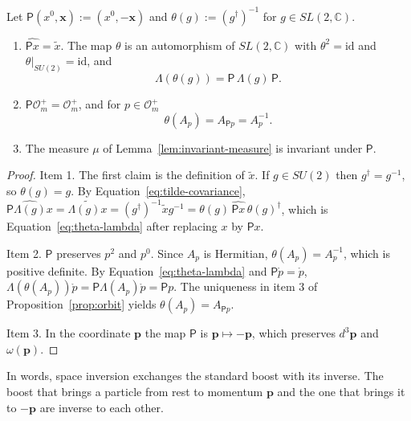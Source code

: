 	\begin{lemma}\label{lem:inversion}
		Let $\mathsf{P}(x^0,\mathbf{x}):=(x^0,-\mathbf{x})$ and $\theta(g):=(g^\dagger)^{-1}$ for $g\in SL(2,\mathbb{C})$.
		\begin{enumerate}
			\item $\widehat{\mathsf{P}x}=\tilde{x}$. The map $\theta$ is an automorphism of $SL(2,\mathbb{C})$ with $\theta^2=\mathrm{id}$ and $\theta|_{SU(2)}=\mathrm{id}$, and
			\begin{equation}\label{eq:theta-lambda}
				\Lambda(\theta(g))=\mathsf{P}\,\Lambda(g)\,\mathsf{P}.
			\end{equation}
			\item $\mathsf{P}\mathcal{O}_m^+=\mathcal{O}_m^+$, and for $p\in\mathcal{O}_m^+$
			\begin{equation}\label{eq:theta-boost}
				\theta(A_p)=A_{\mathsf{P}p}=A_p^{-1}.
			\end{equation}
			\item The measure $\mu$ of Lemma~\ref{lem:invariant-measure} is invariant under $\mathsf{P}$.
		\end{enumerate}
	\end{lemma}
	
	\begin{proof}
		Item 1. The first claim is the definition of $\tilde{x}$. If $g\in SU(2)$ then $g^\dagger=g^{-1}$, so $\theta(g)=g$. By Equation~\eqref{eq:tilde-covariance}, $\widehat{\mathsf{P}\Lambda(g)x}=\widetilde{\Lambda(g)x}=(g^\dagger)^{-1}\tilde{x}g^{-1}=\theta(g)\,\widehat{\mathsf{P}x}\,\theta(g)^\dagger$, which is Equation~\eqref{eq:theta-lambda} after replacing $x$ by $\mathsf{P}x$.
		
		Item 2. $\mathsf{P}$ preserves $p^2$ and $p^0$. Since $A_p$ is Hermitian, $\theta(A_p)=A_p^{-1}$, which is positive definite. By Equation~\eqref{eq:theta-lambda} and $\mathsf{P}\mathring{p}=\mathring{p}$, $\Lambda(\theta(A_p))\mathring{p}=\mathsf{P}\Lambda(A_p)\mathring{p}=\mathsf{P}p$. The uniqueness in item 3 of Proposition~\ref{prop:orbit} yields $\theta(A_p)=A_{\mathsf{P}p}$.
		
		Item 3. In the coordinate $\mathbf{p}$ the map $\mathsf{P}$ is $\mathbf{p}\mapsto-\mathbf{p}$, which preserves $d^3\mathbf{p}$ and $\omega(\mathbf{p})$.
	\end{proof}
	
	\noindent In words, space inversion exchanges the standard boost with its inverse. The boost that brings a particle from rest to momentum $\mathbf{p}$ and the one that brings it to $-\mathbf{p}$ are inverse to each other.
	
